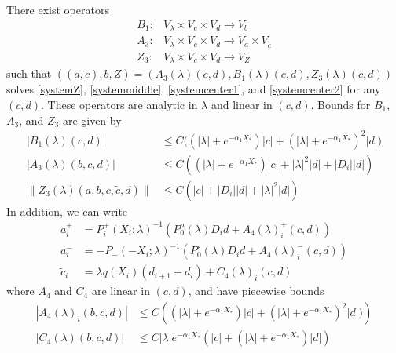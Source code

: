 \documentclass[thesis.tex]{subfiles}
\begin{document}
\begin{lemma}\label{Zinv2}
There exist operators
\begin{align*}
B_1: &V_\lambda \times V_c \times V_d \rightarrow V_b \\
A_3: &V_\lambda \times V_c \times V_d \rightarrow V_a \times V_{\tilde{c}} \\
Z_3: &V_\lambda \times V_c \times V_d \rightarrow V_Z
\end{align*}
such that $( (a, \tilde{c}) , b, Z ) = ( A_3(\lambda)(c, d), B_1(\lambda)(c, d), Z_3(\lambda)(c, d) )$ solves \eqref{systemZ}, \eqref{systemmiddle}, \eqref{systemcenter1}, and \eqref{systemcenter2} for any $(c, d)$. These operators are analytic in $\lambda$ and linear in $(c, d)$. Bounds for $B_1$, $A_3$, and $Z_3$ are given by
\begin{align}
|B_1(\lambda)(c, d)| &\leq C\Big( (|\lambda| + e^{-\alpha_1 X_*})|c| + (|\lambda| + e^{-\alpha_1 X_*})^2 |d| \Big) \label{B1bound} \\
|A_3(\lambda)(b, c, d)| &\leq C \left( (|\lambda| + e^{-\alpha_1 X_*})|c| + |\lambda|^2 |d| + |D_i||d| \right) \label{A3bound} \\
\| Z_3(\lambda)(a,b,c,\tilde{c},d) \| &\leq C\left(|c| + |D_i||d| + |\lambda|^2|d|\right) \label{Z3bound}
\end{align} 
In addition, we can write
\begin{align*}
a_i^+ &= P_i^+(X_i; \lambda)^{-1} \left( P_0^u(\lambda) D_i d + A_4(\lambda)_i^+(c, d) \right) \\
a_i^- &= -P_-(-X_i; \lambda)^{-1} \left( P_0^s(\lambda) D_i d + A_4(\lambda)_i^-(c, d) \right) \\
\tilde{c}_i &= \lambda q(X_i)(d_{i+1} - d_i ) + C_4(\lambda)_i(c, d) 
\end{align*}
where $A_4$ and $C_4$ are linear in $(c, d)$, and have piecewise bounds
\begin{align}
|A_4(\lambda)_i(b, c, d)|
&\leq C \left( (|\lambda| + e^{-\alpha_1 X_*})|c| + (|\lambda| + e^{-\alpha_1 X_*})^2 |d| ) \right)  \label{A4bound} \\
|C_4(\lambda)(b, c, d)| &\leq C |\lambda| e^{-\alpha_1 X_*} \left( |c| + (|\lambda| + e^{-\alpha_1 X_*}) |d| \right) \label{C4bound}
\end{align}


\end{lemma}
\end{document}
